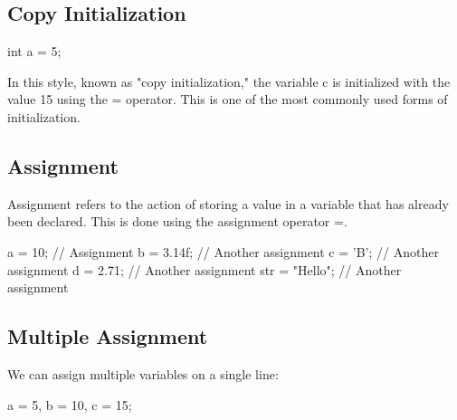 \documentclass{report}
\begin{document}
    \bigbreak \noindent 
    \subsection{Copy Initialization}
    \bigbreak \noindent 
    
    \begin{cppcode}
int a = 5;
    \end{cppcode}
    
    \bigbreak \noindent 
    In this style, known as "copy initialization," the variable c is initialized with the value 15 using the = operator. This is one of the most commonly used forms of initialization.



    \bigbreak \noindent 
    \subsection{Assignment}
    \bigbreak \noindent 
    Assignment refers to the action of storing a value in a variable that has already been declared. This is done using the assignment operator =.
    \bigbreak \noindent 
    
    \begin{cppcode}
a = 10;            // Assignment
b = 3.14f;         // Another assignment
c = 'B';           // Another assignment
d = 2.71;          // Another assignment
str = "Hello";     // Another assignment
    \end{cppcode}
    
    \bigbreak \noindent 
    \subsection{Multiple Assignment}
    \bigbreak \noindent 
    We can assign multiple variables on a single line:
    \bigbreak \noindent 
    
    \begin{cppcode}
a = 5, b = 10, c = 15;
    \end{cppcode}
    

    \pagebreak \bigbreak \noindent 
\end{document}
